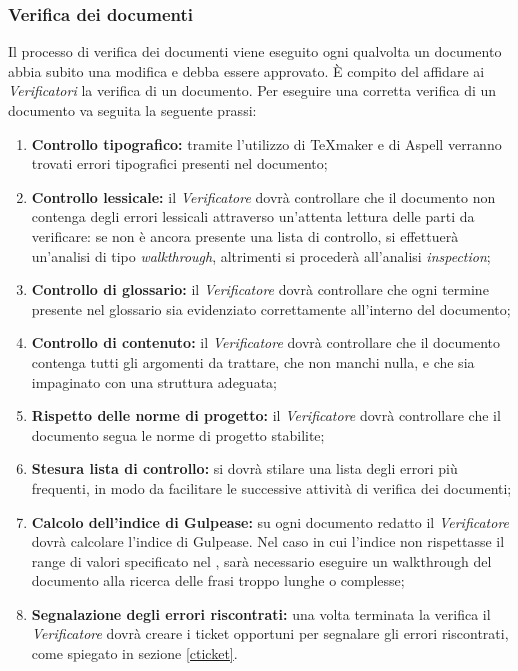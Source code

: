 \subsubsection{Verifica dei documenti}
\label{verifica_doc}
Il processo di verifica dei documenti viene eseguito ogni qualvolta un documento abbia subito una modifica e debba essere approvato. È compito del \projectManager{} affidare ai \emph{Verificatori} la verifica di un documento.
Per eseguire una corretta verifica di un documento va seguita la seguente prassi:
\begin{enumerate}
\item \textbf{Controllo tipografico:} tramite l'utilizzo di \TeX{}maker e di Aspell\glossario{} verranno trovati errori tipografici presenti nel documento;
\item \textbf{Controllo lessicale:} il \emph{Verificatore} dovrà controllare che il documento non contenga degli errori lessicali attraverso un'attenta lettura delle parti da verificare: se non è ancora presente una lista di controllo, si effettuerà un'analisi di tipo \textit{walkthrough}, altrimenti si procederà all'analisi \textit{inspection};
\item \textbf{Controllo di glossario:} il \emph{Verificatore} dovrà controllare che ogni termine presente nel glossario sia evidenziato correttamente all'interno del documento;
\item \textbf{Controllo di contenuto:} il \emph{Verificatore} dovrà controllare che il documento contenga tutti gli argomenti da trattare, che non manchi nulla, e che sia impaginato con una struttura adeguata;
\item \textbf{Rispetto delle norme di progetto:} il \emph{Verificatore} dovrà controllare che il documento segua le norme di progetto stabilite;
\item \textbf{Stesura lista di controllo:} si dovrà stilare una lista degli errori più frequenti, in modo da facilitare le successive attività di verifica dei documenti;
\item \textbf{Calcolo dell'indice di Gulpease:} su ogni documento redatto il \emph{Verificatore} dovrà calcolare l’indice di Gulpease. Nel caso in cui l’indice non rispettasse il range di valori specificato nel \PdQ, sarà necessario eseguire un walkthrough del documento alla ricerca delle frasi troppo lunghe o complesse;
\item \textbf{Segnalazione degli errori riscontrati:} una volta terminata la verifica il \emph{Verificatore} dovrà creare i ticket opportuni per segnalare gli errori riscontrati, come spiegato in sezione \ref{cticket}.
\end{enumerate}


